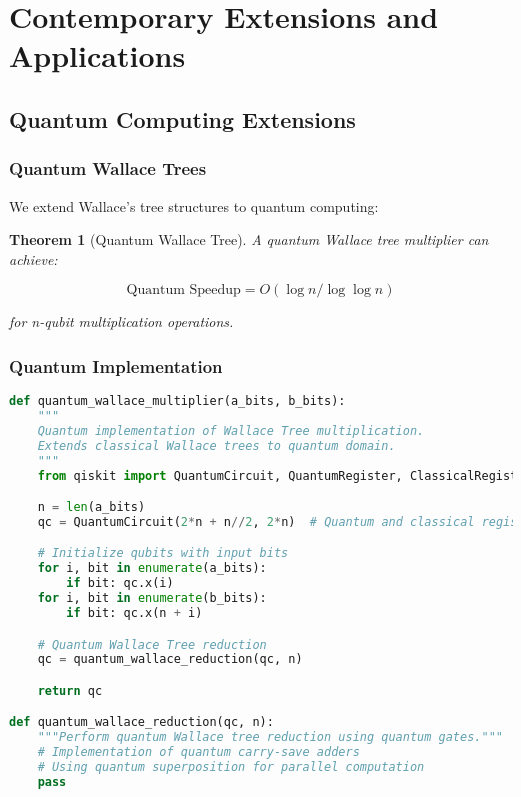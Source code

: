 \documentclass[12pt]{article}
\newtheorem{theorem}{Theorem}
\begin{document}
\section{Contemporary Extensions and Applications}

\subsection{Quantum Computing Extensions}

\subsubsection{Quantum Wallace Trees}

We extend Wallace's tree structures to quantum computing:

\begin{theorem}[Quantum Wallace Tree]
A quantum Wallace tree multiplier can achieve:

\begin{equation}
\text{Quantum Speedup} = O(\log n / \log \log n)
\end{equation}

for n-qubit multiplication operations.
\end{theorem}

\subsubsection{Quantum Implementation}

\begin{lstlisting}[language=Python, caption=Quantum Wallace Tree Implementation]
def quantum_wallace_multiplier(a_bits, b_bits):
    """
    Quantum implementation of Wallace Tree multiplication.
    Extends classical Wallace trees to quantum domain.
    """
    from qiskit import QuantumCircuit, QuantumRegister, ClassicalRegister

    n = len(a_bits)
    qc = QuantumCircuit(2*n + n//2, 2*n)  # Quantum and classical registers

    # Initialize qubits with input bits
    for i, bit in enumerate(a_bits):
        if bit: qc.x(i)
    for i, bit in enumerate(b_bits):
        if bit: qc.x(n + i)

    # Quantum Wallace Tree reduction
    qc = quantum_wallace_reduction(qc, n)

    return qc

def quantum_wallace_reduction(qc, n):
    """Perform quantum Wallace tree reduction using quantum gates."""
    # Implementation of quantum carry-save adders
    # Using quantum superposition for parallel computation
    pass
\end{lstlisting}
\end{document}
